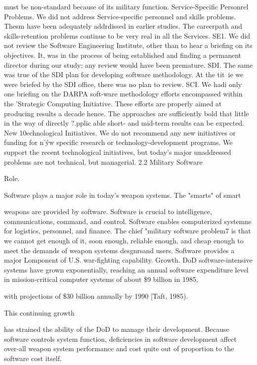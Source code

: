 \documentclass[12pt]{article}
\begin{document}
must be non-standard because of its military function.
Service-Specific Personrel Problems. We did not address Service-specific personnel
and skills problems. Thesm have been adequately addrdissed in earlier studies. The careerpath and skills-retention problems continue to be very real in all the Services.
SE1. We did not review the Software Engineering Institute, other than to hear a briefing
on its objectives. It, was in the process of being established and finding a permanent
director during our study; any review would have been premature.
SDI. The same was true of the SDI plan for developing software methodology. At the
tit~ie we were briefed by the SDI office, there was no plan to review.
SCI. We hadi only one briefing on the DARPA soft-ware methodology efforts encompassed
within the 'Strategic Computing Initiative. These efforts are properly aimed at producing
results a decade hence. The approaches are sufficiently bold that little in the way of
directly ?.pplic able short- and mid-term results can be expected.
New 10echnological Initiatives. We do not recommend any new initiatives or funding
for n'ýw specific research or technology-development programs. We support the recent
technological initiatives, but today's major unaddressed problems are not technical, but
managerial.
2.2 Military Software

Role.

Software plays a major role in today's weapon systems. The "smarts" of smart

weapons are provided by software. Software is crucial to intelligence, communications,
command, and control. Software enables computerized systemns for logistics, personnel,
and finance. The chief "military software problem7 is that we cannot get enough of it,
soon enough, reliable enough, and cheap enough to meet the demands of weapon systems
desgnrsand users. Software provides a major Lomponent of U.S. war-fighting capability.
Growth. DoD software-intensive systems have grown exponentially, reaching an annual
software expenditure level in mission-critical computer systems of about \$9 billion in 1985,

with projections of \$30 billion annually by 1990 [Taft, 1985).

This continuing growth

has strained the ability of the DoD to manage their development. Because software
controls system function, deficiencies in software development affect over-all weapon system
performance and cost quite out of proportion to the software cost itself.
\end{document}
